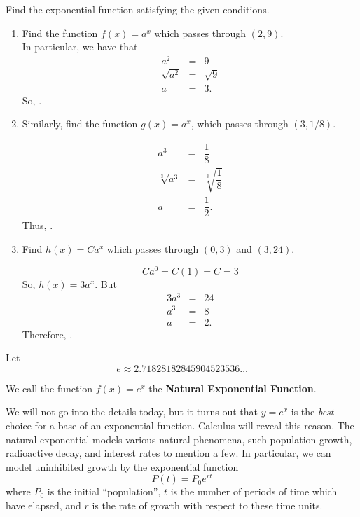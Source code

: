 \documentclass{book}
\begin{document}
\begin{Exam} Find the exponential function satisfying the given conditions.
\begin{enumerate}
\item Find the function $f(x) = a^x$ which passes through $(2,9)$. \\

In particular, we have that
\begin{eqnarray*}
a^2 &=& 9\\
\sqrt{a^2} &=& \sqrt{9}\\
a &=& 3.
\end{eqnarray*}
 So, .\\

\item Similarly, find the function $g(x) = a^x$, which passes through $(3,1/8)$.

\begin{eqnarray*}
a^3 &=& \dfrac{1}{8}\\
\sqrt[3]{a^3} &=& \sqrt[3]{\dfrac{1}{8}}\\
a &=& \dfrac{1}{2}.
\end{eqnarray*}
 Thus, .\\

\item Find $h(x) = Ca^x$ which passes through $(0,3)$ and $(3,24)$.

\[Ca^0 = C(1) = C = 3\]
So, $h(x) = 3a^x$. But 
\begin{eqnarray*}
3a^3 &=& 24\\
a^3 &=& 8\\
a &=& 2.
\end{eqnarray*} Therefore, . 

\end{enumerate}
\end{Exam}\vs

\begin{Def}Let \[ e \approx 2.71828182845904523536\ldots\]

We call the function $f(x) = e^x$ the \textbf{Natural Exponential Function}.
\end{Def}\vs

We will not go into the details today, but it turns out that $y=e^x$ is the \emph{best} choice for a base of an exponential function. Calculus will reveal this reason.  The natural exponential models various natural phenomena, such population growth, radioactive decay, and interest rates to mention a few.  In particular, we can model uninhibited  growth by the exponential function 
\[P(t) = P_0e^{rt}\] where $P_0$ is the initial ``population'', $t$ is the number of periods of time which have elapsed, and $r$ is the rate of growth with respect to these time units.
\end{document}
